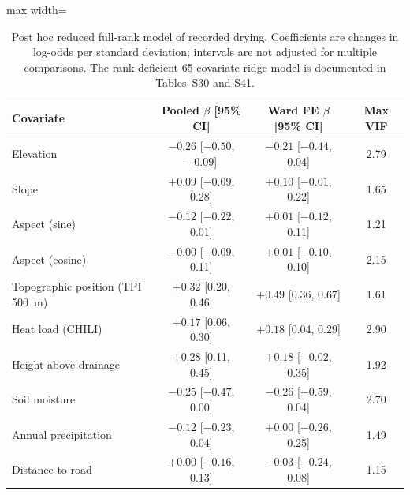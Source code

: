 \documentclass[preprint,12pt,authoryear]{elsarticle}
\begin{document}
\begin{table}[!htbp]
  \centering
  \caption{Post hoc reduced full-rank model of recorded drying. Coefficients are changes in log-odds per standard deviation; intervals are not adjusted for multiple comparisons. The rank-deficient 65-covariate ridge model is documented in Tables~S30 and S41.}
  \label{tab:drivers}
  \small
  \begin{adjustbox}{max width=\linewidth}
  \begin{tabular}{lccc}
    \toprule
    Covariate & Pooled $\beta$ [95\% CI] & Ward FE $\beta$ [95\% CI] & Max VIF \\
    \midrule
    Elevation & $-0.26$ [$-0.50$, $-0.09$] & $-0.21$ [$-0.44$, 0.04] & 2.79 \\
    Slope & $+0.09$ [$-0.09$, 0.28] & $+0.10$ [$-0.01$, 0.22] & 1.65 \\
    Aspect (sine) & $-0.12$ [$-0.22$, 0.01] & $+0.01$ [$-0.12$, 0.11] & 1.21 \\
    Aspect (cosine) & $-0.00$ [$-0.09$, 0.11] & $+0.01$ [$-0.10$, 0.10] & 2.15 \\
    Topographic position (TPI \SI{500}{\metre}) & $+0.32$ [0.20, 0.46] & $+0.49$ [0.36, 0.67] & 1.61 \\
    Heat load (CHILI) & $+0.17$ [0.06, 0.30] & $+0.18$ [0.04, 0.29] & 2.90 \\
    Height above drainage & $+0.28$ [0.11, 0.45] & $+0.18$ [$-0.02$, 0.35] & 1.92 \\
    Soil moisture & $-0.25$ [$-0.47$, 0.00] & $-0.26$ [$-0.59$, 0.04] & 2.70 \\
    Annual precipitation & $-0.12$ [$-0.23$, 0.04] & $+0.00$ [$-0.26$, 0.25] & 1.49 \\
    Distance to road & $+0.00$ [$-0.16$, 0.13] & $-0.03$ [$-0.24$, 0.08] & 1.15 \\
    \bottomrule
  \end{tabular}
  \end{adjustbox}
  \par{}
\end{table}
\end{document}
